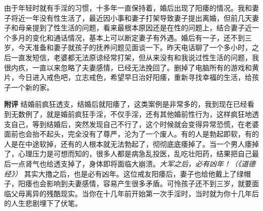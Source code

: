\begin{case}
    由于年轻时就有手淫的习惯，十多年一直保持着，婚后出现了阳痿的情况。我和妻子将近一年没有性生活了，最近因小事和妻子打架导致妻子提出离婚，但前几天妻子和母亲提到了性生活的问题，看来最根本原因还是在性的问题上，结合妻子近一个多月的变化和通话情况，基本上可以断定妻子有外遇。婚后有一子，还不到三岁，今天准备和妻子就孩子的抚养问题见面谈一下。昨天电话聊了一个多小时，之后一直发短信，老婆都无法原谅经常打架，但从来没有和我说过性生活的问题，我很内疚，一直以来忽略了夫妻感情，已经无法挽回了。删掉了电脑所有的游戏和黄片，今日进入戒色吧，立志戒色，希望早日治好阳痿，重新寻找幸福的生活，给孩子一个新的家。

    \textbf{附评} 结婚前疯狂透支，结婚后就阳痿了，这类案例是非常多的，我到现在已经看到无数例了，就是婚前疯狂手淫，不仅手淫，还有其他婚前性行为，这样疯狂地透支自己，等到结婚后，突然发现自己不行了，这个时候就会变得异常恐慌，在老婆面前也会抬不起头，完全没有了尊严，沦为了一个废人。有的人是勃起即软，有的人是在中途软掉，还有的人根本就无法勃起了，彻彻底底痿掉了。当一个男人痿掉了，心理压力是可想而知的，很多人都是病急乱投医，乱吃壮阳药，结果把自己最后一点肾气也给透支掉了，身体即将面临大崩溃。\textit{大军之后，必有凶年！（《道德经》）} 其实大撸之后，也是必有凶年。这位戒友阳痿后，妻子也给他戴上了绿帽子，阳痿也会影响到夫妻感情，容易产生很多矛盾。可怜孩子还不到三岁，就要面临父母离异的残酷现实。当你在十几年前开始第一次手淫时，当时就为你十几年后的人生悲剧埋下了伏笔。
\end{case}

